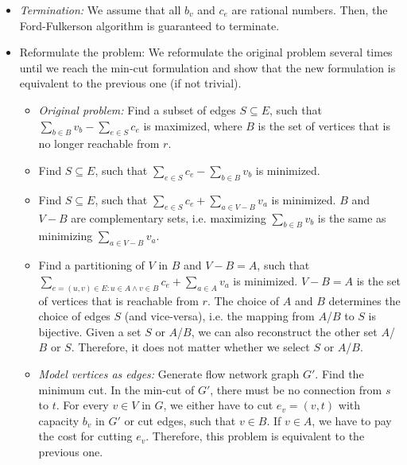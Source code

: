 \documentclass[12pt]{article}
\begin{document}
\begin{itemize}
	\item \emph{Termination:} We assume that all $b_v$ and $c_e$ are rational numbers. Then, the Ford-Fulkerson algorithm is guaranteed to terminate.
	\item Reformulate the problem: We reformulate the original problem several times until we reach the min-cut formulation and show that the new formulation is equivalent to the previous one (if not trivial).
	\begin{itemize}
		\item \emph{Original problem:} Find a subset of edges $S \subseteq E$, such that $\sum_{b \in B} v_b - \sum_{e \in S} c_e$ is maximized, where $B$ is the set of vertices that is no longer reachable from $r$.
		\item Find $S \subseteq E$, such that $\sum_{e \in S} c_e - \sum_{b \in B} v_b$ is minimized.
		\item Find $S \subseteq E$, such that $\sum_{e \in S} c_e + \sum_{a \in V-B} v_a$ is minimized. $B$ and $V-B$ are complementary sets, i.e. maximizing $\sum_{b \in B} v_b$ is the same as minimizing $\sum_{a \in V-B} v_a$.
		\item Find a partitioning of $V$ in $B$ and $V-B=A$, such that $\sum_{e=(u,v) \in E: u \in A \wedge v \in B} c_e + \sum_{a \in A} v_a$ is minimized. $V-B=A$ is the set of vertices that is reachable from $r$. The choice of $A$ and $B$ determines the choice of edges $S$ (and vice-versa), i.e. the mapping from $A$/$B$ to $S$ is bijective. Given a set $S$ or $A$/$B$, we can also reconstruct the other set $A$/$B$ or $S$. Therefore, it does not matter whether we select $S$ or $A$/$B$.
		\item \emph{Model vertices as edges:} Generate flow network graph $G'$. Find the minimum cut. In the min-cut of $G'$, there must be no connection from $s$ to $t$. For every $v \in V$ in $G$, we either have to cut $e_v = (v,t)$ with capacity $b_v$ in $G'$ or cut edges, such that $v \in B$. If $v \in A$, we have to pay the cost for cutting $e_v$. Therefore, this problem is equivalent to the previous one.
	\end{itemize}
\end{itemize}
\end{document}
